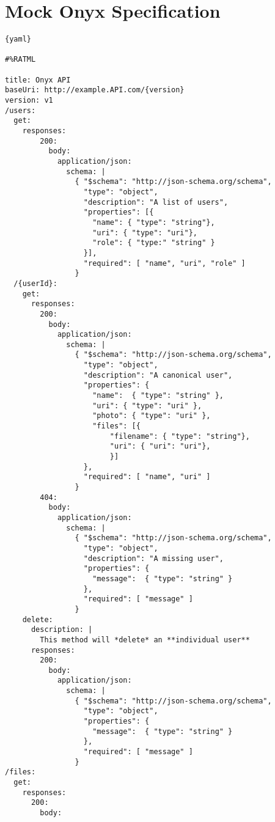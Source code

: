 \chapter{Mock Onyx Specification}

\begin{lstlisting}{yaml}

#%RATML
 
title: Onyx API
baseUri: http://example.API.com/{version}
version: v1
/users:
  get:
    responses:
        200:
          body:
            application/json:
              schema: |
                { "$schema": "http://json-schema.org/schema",
                  "type": "object",
                  "description": "A list of users",
                  "properties": [{
                  	"name": { "type": "string"},
                  	"uri": { "type": "uri"},
                  	"role": { "type:" "string" }
                  }],
                  "required": [ "name", "uri", "role" ]
                }
  /{userId}:
    get:
      responses:
        200:
          body:
            application/json:
              schema: |
                { "$schema": "http://json-schema.org/schema",
                  "type": "object",
                  "description": "A canonical user",
                  "properties": {
                    "name":  { "type": "string" },
                    "uri": { "type": "uri" },
                    "photo": { "type": "uri" },
                    "files": [{
                    	"filename": { "type": "string"},
                    	"uri": { "uri": "uri"},
                    	}]
                  },
                  "required": [ "name", "uri" ]
                }
        404:
          body:
            application/json:
              schema: |
                { "$schema": "http://json-schema.org/schema",
                  "type": "object",
                  "description": "A missing user",
                  "properties": {
                    "message":  { "type": "string" }
                  },
                  "required": [ "message" ]
                }
    delete:
      description: |
        This method will *delete* an **individual user**
      responses:
        200:
          body:
            application/json:
              schema: |
                { "$schema": "http://json-schema.org/schema",
                  "type": "object",
                  "properties": {
                    "message":  { "type": "string" }
                  },
                  "required": [ "message" ]
                }
/files:
  get:
    responses:
      200:
        body:

\end{lstlisting}
